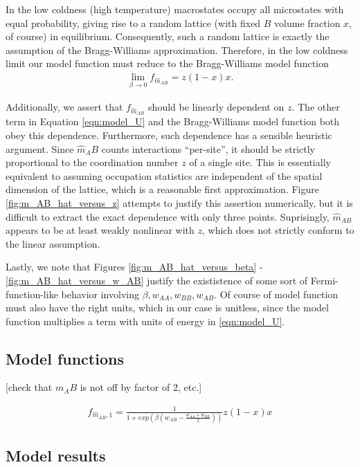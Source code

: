 \documentclass[10pt]{article}
\begin{document}
In the low coldness (high temperature) macrostates occupy all microstates with equal probability, giving rise to a random lattice (with fixed $B$ volume fraction $x$, of course) in equilibrium.
Consequently, such a random lattice is exactly the assumption of the Bragg-Williams approximation.
Therefore, in the low coldness limit our model function must reduce to the Bragg-Williams model function
\begin{align}
    \lim_{\beta \rightarrow 0} f_{\hat{m}_{AB}} = z (1-x) x.
\end{align}

Additionally, we assert that $f_{\hat{m}_{AB}}$ should be linearly dependent on $z$.
The other term in Equation \ref{eqn:model_U} and the Bragg-Williams model function both obey this dependence.
Furthermore, such dependence has a sensible heuristic argument.
Since $\hat{m}_AB$ counts interactions ``per-site'', it should be strictly proportional to the coordination number $z$ of a single site.
This is essentially equivalent to assuming occupation statistics are independent of the spatial dimension of the lattice, which is a reasonable first approximation.
Figure \ref{fig:m_AB_hat_versus_z} attempts to justify this assertion numerically, but it is difficult to extract the exact dependence with only three points.
Suprisingly, $\hat{m}_{AB}$ appears to be at least weakly nonlinear with $z$, which does not strictly conform to the linear assumption.

Lastly, we note that Figures \ref{fig:m_AB_hat_versus_beta} - \ref{fig:m_AB_hat_versus_w_AB} justify the exististence of some sort of Fermi-function-like behavior involving $\beta,w_{AA},w_{BB},w_{AB}$.
Of course of model function must also have the right units, which in our case is unitless, since the model function multiplies a term with units of energy in \ref{eqn:model_U}.

\subsection{Model functions}
[check that $m_AB$ is not off by factor of 2, etc.]

\begin{align}
    f_{\hat{m}_{AB},1} = 
    \frac{1}{1 + exp\left(\beta \left(w_{AB} - \frac{w_{AA} + w_{BB}}{2}\right) \right)}
    z (1-x) x
\end{align}


\subsection{Model results}
\end{document}
